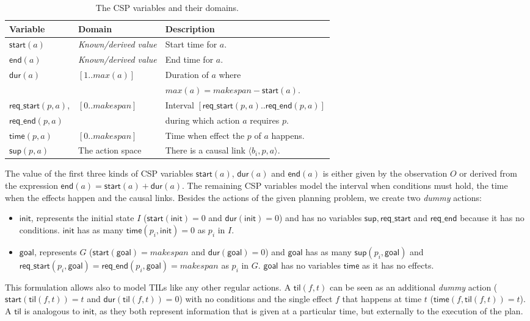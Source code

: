 \documentclass{ecai}
\newcommand{\tup}[1]{{\langle #1 \rangle}}
\newcommand{\dur}{\mathsf{dur}}    %
\newcommand{\start}{\mathsf{start}}%
\newcommand{\en}{\mathsf{end}}     %
\newcommand{\til}{\mathsf{til}}    %
\newcommand{\supp}{\mathsf{sup}}   %
\newcommand{\tim}{\mathsf{time}}   %
\newcommand{\reqs}{\mathsf{req\_{start}}} %
\newcommand{\reqe}{\mathsf{req\_{end}}}   %
\newcommand{\ini}{\mathsf{init}}   %
\newcommand{\goal}{\mathsf{goal}}  %
\begin{document}
\begin{table}
\setlength\extrarowheight{2pt}  
\begin{scriptsize}
\begin{tabular}{lll}
{\bf Variable} & {\bf Domain} & {\bf Description} \\\hline
$\start(a)$ & \emph{Known/derived value} & Start time for $a$.\\
$\en(a)$ & \emph{Known/derived value} & End time for $a$.\\
$\dur(a)$ & $[1..max(a)]$ & Duration of $a$ where \\
&&$max(a)=makespan-\start(a)$.\\

$\reqs(p,a)$, & $[0..makespan]$ & Interval $[\reqs(p,a)..\reqe(p,a)]$ \\ 
$\reqe(p,a)$ && during which action $a$ requires $p$.\\

$\tim(p,a)$ & $[0..makespan]$ & Time when effect the $p$ of $a$ happens.\\

$\supp(p,a)$ & The action space & There is a causal link $\tup{b_i,p,a}$. 
\end{tabular}
\end{scriptsize}
\caption{\small The CSP variables and their domains.}
\label{table:variables}
\end{table}

The value of the first three kinds of CSP variables $\start(a)$, $\dur(a)$ and $\en(a)$ is either given by the observation $O$ or derived from the expression $\en(a)=\start(a)+\dur(a)$. The remaining CSP variables model the interval when conditions must hold, the time when the effects happen and the causal links. Besides the actions of the given planning problem, we create two {\em dummy} actions:
\begin{itemize}
\item $\ini$, represents the initial state $I$ ($\start(\ini)=0$ and $\dur(\ini)=0$) and has no variables $\supp, \reqs$ and $\reqe$ because it has no conditions. $\ini$ has as many $\tim(p_i,\ini)=0$ as $p_i$ in $I$.
\item $\goal$, represents $G$ ($\start(\goal)=makespan$ and $\dur(\goal)=0$) and $\goal$ has as many $\supp(p_i,\goal)$ and $\reqs(p_i,\goal)=\reqe(p_i,\goal)=makespan$ as $p_i$ in $G$. $\goal$ has no variables $\tim$ as it has no effects.
\end{itemize}  

This formulation allows also to model TILs like any other regular actions. A $\til(f,t)$ can be seen as an additional {\em dummy} action ($\start(\til(f,t))=t$ and $\dur(\til(f,t))=0$) with no conditions and the single effect $f$ that happens at time $t$ ($\tim(f,\til(f,t))=t$). A $\til$ is analogous to $\ini$, as they both represent information that is given at a particular time, but externally to the execution of the plan. 
\end{document}
